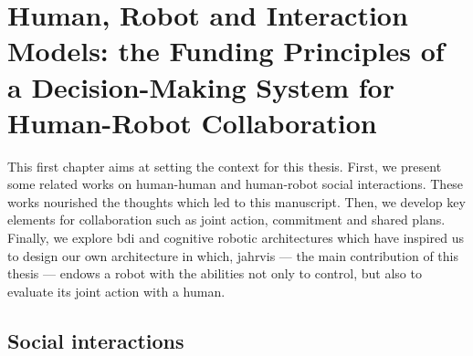 \documentclass[a4paper,11pt,twoside]{StyleThese}
\begin{document}
\setcounter{chapter}{0} %
\dominitoc
\faketableofcontents
\fi

\chapter{Human, Robot and Interaction Models: the Funding Principles of a Decision-Making System for Human-Robot Collaboration}
\label{chapter:chap1}
\minitoc

This first chapter aims at setting the context for this thesis. First, we present some related works on human-human and human-robot social interactions. These works nourished the thoughts which led to this manuscript. Then, we develop key elements for collaboration such as joint action, commitment and shared plans. Finally, we explore \acrfull{bdi} and cognitive robotic architectures  which have inspired us to design our own architecture in which, \acrshort{jahrvis} —  the main contribution of this thesis — endows a robot with the abilities not only to control, but also to evaluate its joint action with a human. 


\section{Social interactions}\label{sec:soc_int}
\end{document}
